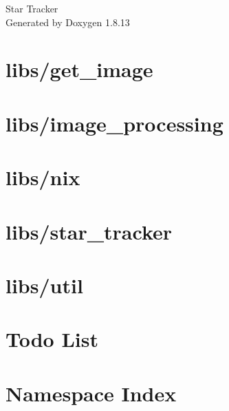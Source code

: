 \documentclass[twoside]{book}
\newcommand{\+}{\discretionary{\mbox{\scriptsize$\hookleftarrow$}}{}{}}
\newcommand{\clearemptydoublepage}{%
  \newpage{\pagestyle{empty}\cleardoublepage}%
}
\begin{document}
\hypersetup{pageanchor=false,
             bookmarksnumbered=true,
             pdfencoding=unicode
            }
\begin{titlepage}
\vspace*{7cm}
\begin{center}%
{\Large Star Tracker }\\
\vspace*{1cm}
{\large Generated by Doxygen 1.8.13}\\
\end{center}
\end{titlepage}
\clearemptydoublepage
{}
\tableofcontents
\clearemptydoublepage
{}
\hypersetup{pageanchor=true}

\chapter{libs/get\+\_\+image}
\label{md_libs_get_image_README}

\chapter{libs/image\+\_\+processing}
\label{md_libs_image_processing_README}

\chapter{libs/nix}
\label{md_libs_nix_README}

\chapter{libs/star\+\_\+tracker}
\label{md_libs_star_tracker_README}

\chapter{libs/util}
\label{md_libs_util_README}

\chapter{Todo List}
\label{todo}

\chapter{Namespace Index}

\end{document}
